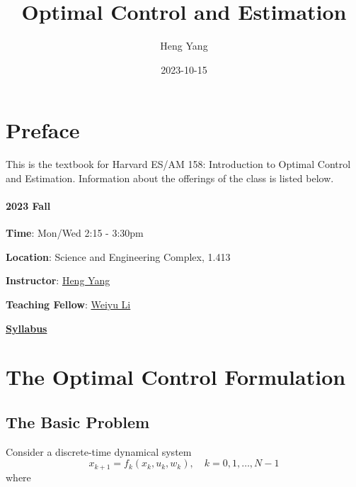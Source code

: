 \documentclass[
]{book}
\title{Optimal Control and Estimation}
\author{Heng Yang}
\date{2023-10-15}
\theoremstyle{definition}
\theoremstyle{definition}
\theoremstyle{definition}
\theoremstyle{definition}
\theoremstyle{remark}
\begin{document}
\maketitle

{
\setcounter{tocdepth}{1}
\tableofcontents
}
\hypertarget{preface}{%
\chapter*{Preface}\label{preface}}

This is the textbook for Harvard ES/AM 158: Introduction to Optimal Control and Estimation. Information about the offerings of the class is listed below.

\hypertarget{fall}{%
\subsubsection*{2023 Fall}\label{fall}}

\textbf{Time}: Mon/Wed 2:15 - 3:30pm

\textbf{Location}: Science and Engineering Complex, 1.413

\textbf{Instructor}: \href{https://hankyang.seas.harvard.edu/}{Heng Yang}

\textbf{Teaching Fellow}: \href{https://scholar.harvard.edu/weiyuli/home}{Weiyu Li}

\href{https://docs.google.com/document/d/1q8_jB5dLx9jHOBi3DQ48Vv2E243ocGCGm_H0mJuOojM/edit?usp=sharing}{\textbf{Syllabus}}

\hypertarget{formulation}{%
\chapter{The Optimal Control Formulation}\label{formulation}}

\hypertarget{the-basic-problem}{%
\section{The Basic Problem}\label{the-basic-problem}}

Consider a discrete-time dynamical system
\begin{equation}
x_{k+1} = f_k (x_k, u_k, w_k), \quad k =0,1,\dots,N-1
\label{eq:discrete-time-dynamics}
\end{equation}
where
\end{document}
